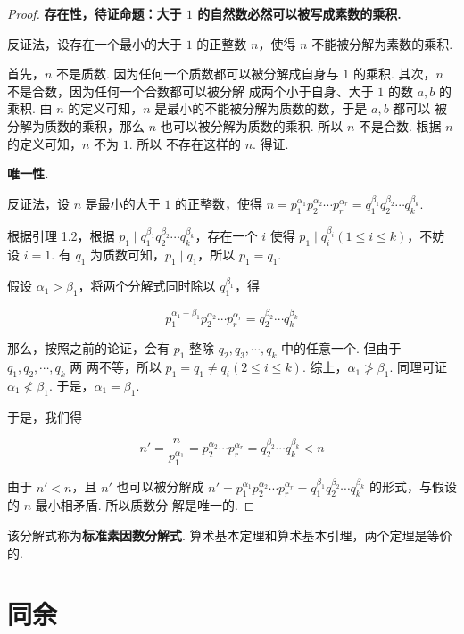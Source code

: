 \documentclass[a4paper]{article}
\begin{document}
\begin{proof}
    \textbf{存在性，待证命题：大于 $1$ 的自然数必然可以被写成素数的乘积. }

    反证法，设存在一个最小的大于 $1$ 的正整数 $n$，使得 $n$ 不能被分解为素数的乘积.

    首先，$n$ 不是质数. 因为任何一个质数都可以被分解成自身与 $1$ 的乘积. 其次，$n$ 不是合数，因为任何一个合数都可以被分解
    成两个小于自身、大于 $1$ 的数 $a,b$ 的乘积. 由 $n$ 的定义可知，$n$ 是最小的不能被分解为质数的数，于是 $a,b$ 都可以
    被分解为质数的乘积，那么 $n$ 也可以被分解为质数的乘积. 所以 $n$ 不是合数. 根据 $n$ 的定义可知，$n$ 不为 $1$. 所以
    不存在这样的 $n$. 得证.

    \textbf{唯一性. }

    反证法，设 $n$ 是最小的大于 $1$ 的正整数，使得 $n=p_1^{\alpha_1}p_2^{\alpha_2}\cdots p_r^{\alpha_r}
        =q_1^{\beta_1}q_2^{\beta_2}\cdots q_k^{\beta_k}$.

    根据引理 1.2，根据 $p_1\mid q_1^{\beta_1}q_2^{\beta_2}\cdots q_k^{\beta_k}$，存在一个 $i$ 使得 $p_1
        \mid q_i^{\beta_i}(1\le i\le k)$，不妨设 $i=1$. 有 $q_1$ 为质数可知，$p_1\mid q_1$，所以 $p_1=q_1$.

    假设 $\alpha_1>\beta_1$，将两个分解式同时除以 $q_1^{\beta_1}$，得

    $$
        p_1^{\alpha_1-\beta_1}p_2^{\alpha_2}\cdots p_r^{\alpha_r}=q_2^{\beta_2}\cdots q_k^{\beta_k}
    $$

    那么，按照之前的论证，会有 $p_1$ 整除 $q_2,q_3,\cdots,q_k$ 中的任意一个. 但由于 $q_1,q_2,\cdots,q_k$ 两
    两不等，所以 $p_1=q_1\ne q_i(2\le i\le k)$. 综上，$\alpha_1\not>\beta_1$. 同理可证 $\alpha_1\not<
        \beta_1$. 于是，$\alpha_1=\beta_1$.

    于是，我们得

    $$
        n'=\frac{n}{p_1^{\alpha_1}}=p_2^{\alpha_2}\cdots p_r^{\alpha_r}=q_2^{\beta_2}\cdots q_k^{\beta_k}
        <n
    $$

    由于 $n'<n$，且 $n'$ 也可以被分解成 $n'=p_1^{\alpha_1}p_2^{\alpha_2}\cdots p_r^{\alpha_r}
        =q_1^{\beta_1}q_2^{\beta_2}\cdots q_k^{\beta_k}$ 的形式，与假设的 $n$ 最小相矛盾. 所以质数分
    解是唯一的.
\end{proof}

该分解式称为\textbf{标准素因数分解式}. 算术基本定理和算术基本引理，两个定理是等价的.

\section{同余}
\end{document}
